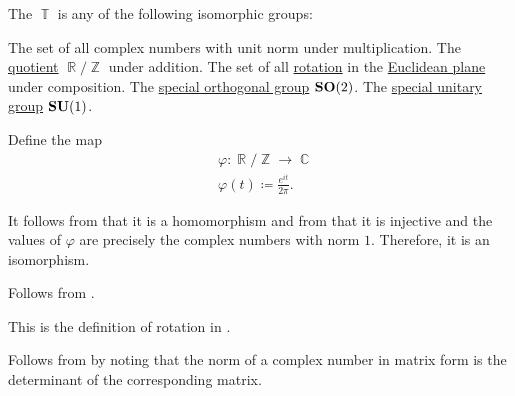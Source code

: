 \begin{definition}\label{def:circle_group}\mimprovised
  The  \( \BbbT \) is any of the following isomorphic groups:
  \begin{thmenum}
     The set of all complex numbers with unit norm under multiplication.
     The \hyperref[def:group/quotient]{quotient} \( \BbbR / \BbbZ \) under addition.
     The set of all \hyperref[def:rigid_motion/rotation]{rotation} in the \hyperref[def:euclidean_plane]{Euclidean plane} under composition.
     The \hyperref[def:unitary_groups]{special orthogonal group} \( \operatorname{\mathbf{SO}}(2) \).
     The \hyperref[def:unitary_groups]{special unitary group} \( \operatorname{\mathbf{SU}}(1) \).
  \end{thmenum}
\end{definition}
\begin{defproof}
   Define the map
  \begin{equation*}
    \begin{aligned}
      &\varphi: \BbbR / \BbbZ \to \BbbC \\
      &\varphi(t) \coloneqq \frac {e^{it}} {2\pi}.
    \end{aligned}
  \end{equation*}

  It follows from  that it is a homomorphism and from  that it is injective and the values of \( \varphi \) are precisely the complex numbers with norm \( 1 \). Therefore, it is an isomorphism.

   Follows from .

   This is the definition of rotation in .

   Follows from  by noting that the norm of a complex number in matrix form is the determinant of the corresponding matrix.
\end{defproof}
